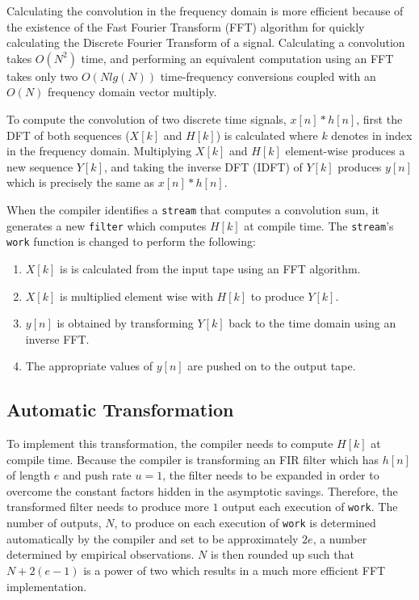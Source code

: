 Calculating the convolution in the frequency domain is more efficient
because of the existence of the Fast Fourier Transform (FFT) algorithm
for quickly calculating the Discrete Fourier Transform of a signal.
Calculating a convolution takes $O(N^2)$ time, and performing an equivalent
computation using an FFT takes only two $O(N lg(N))$
time-frequency conversions coupled with an $O(N)$ frequency domain
vector multiply.


To compute the convolution of two discrete time signals, $x[n]*h[n]$,
first the DFT of both sequences ($X[k]$ and $H[k]$) is calculated where
$k$ denotes in index in the frequency domain.
Multiplying $X[k]$ and $H[k]$ element-wise produces a new
sequence $Y[k]$, and taking the inverse DFT (IDFT) of $Y[k]$ produces
$y[n]$ which is precisely the same as $x[n]*h[n]$.

When the compiler identifies a {\tt stream} that computes a convolution sum,
it generates a new {\tt filter} which computes $H[k]$ at compile time. 
The {\tt stream}'s {\tt work} function is changed to perform the following:
\begin{enumerate}
\item $X[k]$ is is calculated from the input tape using an FFT algorithm. 
\vspace{-6pt}
\item $X[k]$ is multiplied element wise with $H[k]$ to produce $Y[k]$. 
\vspace{-6pt}
\item $y[n]$ is obtained by transforming $Y[k]$ back to the time domain using an inverse FFT.
\vspace{-6pt}
\item The appropriate values of $y[n]$ are pushed on to the output tape.
\end{enumerate} 

\subsection{Automatic Transformation}

To implement this transformation, the compiler needs to compute $H[k]$ at
compile time. Because the compiler is transforming an FIR filter 
which has $h[n]$ of length $e$ and push rate $u=1$, the filter needs to be 
expanded in order to overcome the constant factors hidden in the asymptotic savings.
Therefore, the transformed filter needs to produce more $1$ output each
execution of {\tt work}. The number of outputs, $N$, to produce on each 
execution of {\tt work} is determined automatically by the compiler and set to be 
approximately $2e$, a number determined by empirical observations. $N$ is then rounded 
up such that $N+2(e-1)$ is a power of two which results in a much more efficient 
FFT implementation.

